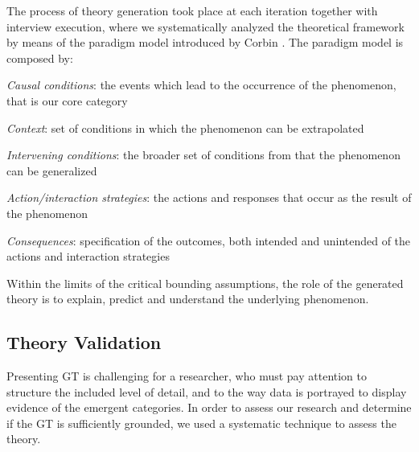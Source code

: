 \documentclass[10pt,journal,letterpaper,compsoc]{IEEEtran}
\begin{document}
The process of theory generation took place at each iteration together with
interview execution, where we systematically analyzed the theoretical framework
by means of the paradigm model introduced by Corbin \cite{Corbin1990}. The
paradigm model is composed by:

\begin{compactitem} 
\item \textit{Causal conditions}: the events which lead to the occurrence of  
the phenomenon, that is our core category 
\item \textit{Context}: set of conditions in which the phenomenon can be 
extrapolated
\item \textit{Intervening conditions}: the broader set of conditions from that
the phenomenon can be generalized 
\item \textit{Action/interaction strategies}: the actions and responses that  
occur as the result of the phenomenon 
\item \textit{Consequences}: specification of the outcomes, both intended and
unintended of the actions and interaction strategies 
\end{compactitem}

Within the limits of the critical bounding assumptions, the role of the
generated theory is to explain, predict and understand the underlying
phenomenon.

\subsection{Theory Validation} \label{rm:val} 

Presenting GT is challenging for a researcher, who must pay attention to
structure the included level of detail, and to the way data is portrayed to
display evidence of the emergent categories.  In order to assess our research
and determine if the GT is sufficiently grounded, we used a systematic technique
to assess the theory.
\end{document}

